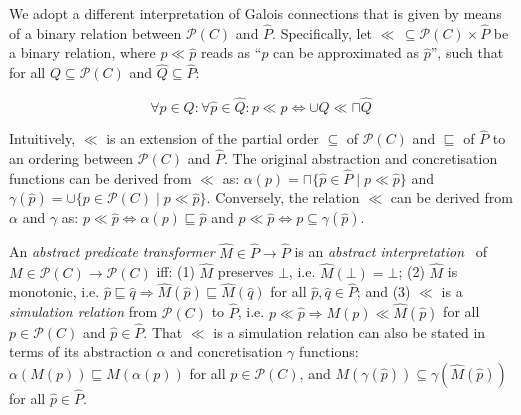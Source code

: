 

We adopt a different interpretation of Galois connections that is given by means of a binary relation between $\mathcal{P}(C)$ and $\hat P$. Specifically, let $\ll \, \subseteq \mathcal{P}(C) \times \hat P$ be a binary relation, where $p \ll \hat p$ reads as ``$p$ can be approximated as $\hat p$'', such that for all $Q \subseteq \mathcal{P}(C)$ and $\hat Q \subseteq \hat P$:


\begin{equation*}
\forall p \in Q : \forall \hat p \in \hat Q : p \ll \hat p \iff \cup Q \ll \sqcap \hat Q
\end{equation*}

\noindent Intuitively, $\ll$ is an extension of the partial order $\subseteq$ of $\mathcal{P}(C)$ and $\sqsubseteq$ of $\hat P$ to an ordering between $\mathcal{P}(C)$ and $\hat P$. The original abstraction and concretisation functions can be derived from $\ll$ as: $\alpha(p) = \sqcap \{ \hat p \in \hat P \mid p \ll \hat p \}$ and $\gamma(\hat p) = \cup \{ p \in \mathcal{P}(C) \mid p \ll \hat p \}$. Conversely, the relation $\ll$ can be derived from $\alpha$ and $\gamma$ as: $p \ll \hat p \iff \alpha(p) \sqsubseteq \hat p$ and $p \ll \hat p \iff p \subseteq \gamma(\hat p)$.

An \textit{abstract predicate transformer} $\hat M \in \hat P \rightarrow \hat P$ is an \textit{abstract interpretation}~\cite{cousot1996} of $M \in \mathcal{P}(C) \rightarrow \mathcal{P}(C)$ iff: (1) $\hat M$ preserves $\bot$, i.e. $\hat M(\bot) = \bot$; (2) $\hat M$ is monotonic, i.e. $\hat p \sqsubseteq \hat q \Rightarrow \hat M (\hat p) \sqsubseteq \hat M (\hat q)$ for all $\hat p, \hat q \in \hat P$; and (3) $\ll$ is a \textit{simulation relation} from $\mathcal{P}(C)$ to $\hat P$, i.e. $p \ll \hat p \Rightarrow M (p) \ll \hat M (\hat p)$ for all $p \in \mathcal{P}(C)$ and $\hat p \in \hat P$. That $\ll$ is a simulation relation can also be stated in terms of its abstraction $\alpha$ and concretisation $\gamma$ functions: $\alpha(M(p)) \sqsubseteq \hat M(\alpha(p))$ for all $p \in \mathcal{P}(C)$, and $M(\gamma(\hat p)) \subseteq \gamma(\hat M(\hat p))$ for all $\hat p \in \hat P$.


